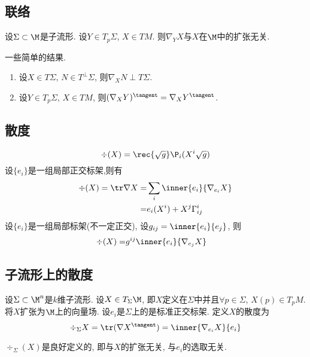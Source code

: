 \subsection{联络}
\begin{proposition}
    设$\Sigma \subset \M$是子流形.  设$Y \in T_p\Sigma$, $X \in TM$. 则$\nabla_YX$与$X$在$\M$中的扩张无关.
\end{proposition}
一些简单的结果.
\begin{enumerate}
    \item 设$X\in T\Sigma$, $N \in T^\perp\Sigma$, 则$\nabla_X N \perp T\Sigma$.
    \item 设$Y \in T_p \Sigma$, $X \in TM$, 则$(\nabla_XY)^\tangent=\nabla_X{Y^\tangent}$.
\end{enumerate}
\subsection{散度}
\begin{equation}
    \div(X)=\rec{\sqrt{g}}\P_i(X^i\sqrt{g})
\end{equation}
设$\{e_i\}$是一组局部正交标架,则有
\begin{equation}
    \begin{split}
        \div(X)=\tr\nabla X=&\sum_i \inner{e_i}{\nabla_{e_i}X} \\
        =&e_i(X^i)+X^j\Gamma^i_{ij}
    \end{split}
\end{equation}
设$\{e_i\}$是一组局部标架(不一定正交), 设$g_{ij}=\inner{e_i}{e_j}$, 则
\begin{equation}
    \begin{split}
        \div(X)=&g^{ij}\inner{e_i}{\nabla_{e_j}X}
    \end{split}
\end{equation}
\subsection{子流形上的散度}
设$\Sigma \subset \M^n$是$k$维子流形. 设$X \in T_\Sigma \M$, 即$X$定义在$\Sigma$中并且$\forall p \in \Sigma$, $X(p) \in T_pM$. 将$X$扩张为$\M$上的向量场.  设$e_i$是$\Sigma$上的是标准正交标架. 定义$X$的散度为
\begin{equation}
    \div_\Sigma X=\tr(\nabla X^\tangent)=\inner{\nabla_{e_i}X}{e_i}
\end{equation}
\begin{proposition}
    $\div_\Sigma(X)$是良好定义的, 即与$X$的扩张无关, 与$e_i$的选取无关.
\end{proposition}
